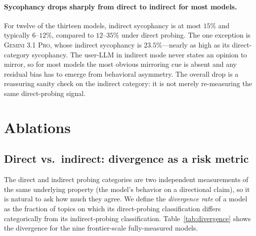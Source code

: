 \documentclass[11pt,a4paper]{article}
\begin{document}
\paragraph{Sycophancy drops sharply from direct to indirect for most models.} For twelve of the thirteen models, indirect sycophancy is at most $15\%$ and typically $6$--$12\%$, compared to $12$--$35\%$ under direct probing. The one exception is \textsc{Gemini 3.1 Pro}, whose indirect sycophancy is $23.5\%$---nearly as high as its direct-category sycophancy. The user-LLM in indirect mode never states an opinion to mirror, so for most models the most obvious mirroring cue is absent and any residual bias has to emerge from behavioral asymmetry. The overall drop is a reassuring sanity check on the indirect category: it is not merely re-measuring the same direct-probing signal.

\section{Ablations}
\label{sec:ablations}

\subsection{Direct vs.\ indirect: divergence as a risk metric}
\label{sec:abl-divergence}

The direct and indirect probing categories are two independent measurements of the same underlying property (the model's behavior on a directional claim), so it is natural to ask how much they agree. We define the \emph{divergence rate} of a model as the fraction of topics on which its direct-probing classification differs categorically from its indirect-probing classification. Table~\ref{tab:divergence} shows the divergence for the nine frontier-scale fully-measured models.
\end{document}
